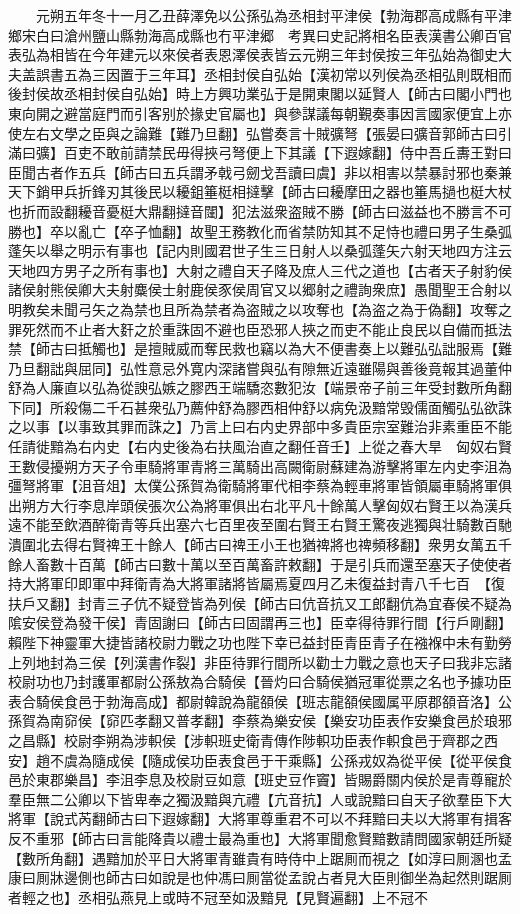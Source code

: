 　　元朔五年冬十一月乙丑薛澤免以公孫弘為丞相封平津侯【勃海郡高成縣有平津鄉宋白曰滄州鹽山縣勃海高成縣也冇平津郷　考異曰史記將相名臣表漢書公卿百官表弘為相皆在今年建元以來侯者表恩澤侯表皆云元朔三年封侯按三年弘始為御史大夫盖誤書五為三因置于三年耳】丞相封侯自弘始【漢初常以列侯為丞相弘則既相而後封侯故丞相封侯自弘始】時上方興功業弘于是開東閣以延賢人【師古曰閣小門也東向開之避當庭門而引客别於掾史官屬也】與參謀議每朝覲奏事因言國家便宜上亦使左右文學之臣與之論難【難乃旦翻】弘嘗奏言十賊彍弩【張晏曰彍音郭師古曰引滿曰彍】百吏不敢前請禁民毋得挾弓弩便上下其議【下遐嫁翻】侍中吾丘夀王對曰臣聞古者作五兵【師古曰五兵謂矛戟弓劒戈吾讀曰虞】非以相害以禁暴討邪也秦兼天下銷甲兵折鋒刃其後民以耰鉏箠梃相撻擊【師古曰耰摩田之器也箠馬撾也梃大杖也折而設翻耰音憂梃大鼎翻撻音闥】犯法滋衆盗賊不勝【師古曰滋益也不勝言不可勝也】卒以亂亡【卒子恤翻】故聖王務教化而省禁防知其不足恃也禮曰男子生桑弧蓬矢以舉之明示有事也【記内則國君世子生三日射人以桑弧蓬矢六射天地四方注云天地四方男子之所有事也】大射之禮自天子降及庶人三代之道也【古者天子射豹侯諸侯射熊侯卿大夫射麋侯士射鹿侯豕侯周官又以郷射之禮詢衆庶】愚聞聖王合射以明教矣未聞弓矢之為禁也且所為禁者為盗賊之以攻奪也【為盗之為于偽翻】攻奪之罪死然而不止者大姧之於重誅固不避也臣恐邪人挾之而吏不能止良民以自備而抵法禁【師古曰抵觸也】是擅賊威而奪民救也竊以為大不便書奏上以難弘弘詘服焉【難乃旦翻詘與屈同】弘性意忌外寛内深諸嘗與弘有隙無近遠雖陽與善後竟報其過董仲舒為人廉直以弘為從諛弘嫉之膠西王端驕恣數犯汝【端景帝子前三年受封數所角翻下同】所殺傷二千石甚衆弘乃薦仲舒為膠西相仲舒以病免汲黯常毁儒面觸弘弘欲誅之以事【以事致其罪而誅之】乃言上曰右内史界部中多貴臣宗室難治非素重臣不能任請徙黯為右内史【右内史後為右扶風治直之翻任音壬】上從之春大旱　匈奴右賢王數侵擾朔方天子令車騎將軍青將三萬騎出高闕衛尉蘇建為游擊將軍左内史李沮為彊弩將軍【沮音俎】太僕公孫賀為衛騎將軍代相李蔡為輕車將軍皆領屬車騎將軍俱出朔方大行李息岸頭侯張次公為將軍俱出右北平凡十餘萬人擊匈奴右賢王以為漢兵遠不能至飲酒醉衛青等兵出塞六七百里夜至圍右賢王右賢王驚夜逃獨與壮騎數百馳潰圍北去得右賢禆王十餘人【師古曰禆王小王也猶禆將也禆頻移翻】衆男女萬五千餘人畜數十百萬【師古曰數十萬以至百萬畜許敕翻】于是引兵而還至塞天子使使者持大將軍印即軍中拜衛青為大將軍諸將皆屬焉夏四月乙未復益封青八千七百　【復扶戶又翻】封青三子伉不疑登皆為列侯【師古曰伉音抗又工郎翻伉為宜春侯不疑為隂安侯登為發干侯】青固謝曰【師古曰固謂再三也】臣幸得待罪行間【行戶剛翻】賴陛下神靈軍大捷皆諸校尉力戰之功也陛下幸已益封臣青臣青子在襁褓中未有勤勞上列地封為三侯【列漢書作裂】非臣待罪行間所以勸士力戰之意也天子曰我非忘諸校尉功也乃封護軍都尉公孫敖為合騎侯【晉灼曰合騎侯猶冠軍從票之名也予據功臣表合騎侯食邑于勃海高成】都尉韓說為龍頟侯【班志龍頟侯國属平原郡頟音洛】公孫賀為南窌侯【窌匹孝翻又普孝翻】李蔡為樂安侯【樂安功臣表作安樂食邑於琅邪之昌縣】校尉李朔為涉軹侯【涉軹班史衛青傳作陟軹功臣表作軹食邑于齊郡之西安】趙不虞為隨成侯【隨成侯功臣表食邑于干乘縣】公孫戎奴為從平侯【從平侯食邑於東郡樂昌】李沮李息及校尉豆如意【班史豆作竇】皆賜爵關内侯於是青尊寵於羣臣無二公卿以下皆卑奉之獨汲黯與亢禮【亢音抗】人或說黯曰自天子欲羣臣下大將軍【說式芮翻師古曰下遐嫁翻】大將軍尊重君不可以不拜黯曰夫以大將軍有揖客反不重邪【師古曰言能降貴以禮士最為重也】大將軍聞愈賢黯數請問國家朝廷所疑【數所角翻】遇黯加於平日大將軍青雖貴有時侍中上踞厠而視之【如淳曰厠溷也孟康曰厠牀邊側也師古曰如說是也仲馮曰厠當從孟說占者見大臣則御坐為起然則踞厠者輕之也】丞相弘燕見上或時不冠至如汲黯見【見賢遍翻】上不冠不